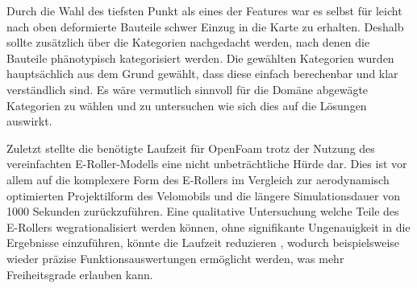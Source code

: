 Durch die Wahl des tiefsten Punkt als eines der Features war es selbst für leicht nach oben deformierte Bauteile schwer Einzug in die Karte zu erhalten.
Deshalb sollte zusätzlich über die Kategorien nachgedacht werden, nach denen die Bauteile phänotypisch kategorisiert werden.
Die gewählten Kategorien wurden hauptsächlich aus dem Grund gewählt, dass diese einfach berechenbar und klar verständlich sind.
Es wäre vermutlich sinnvoll für die Domäne abgewägte Kategorien zu wählen und zu untersuchen wie sich dies auf die Lösungen auswirkt.

Zuletzt stellte die benötigte Laufzeit für OpenFoam trotz der Nutzung des vereinfachten E-Roller-Modells eine nicht unbeträchtliche Hürde dar.
Dies ist vor allem auf die komplexere Form des E-Rollers im Vergleich zur aerodynamisch optimierten Projektilform des Velomobils und die längere Simulationsdauer von 1000 Sekunden zurückzuführen.
Eine qualitative Untersuchung welche Teile des E-Rollers wegrationalisiert werden können, ohne signifikante Ungenauigkeit in die Ergebnisse einzuführen, könnte die Laufzeit reduzieren , wodurch beispielsweise wieder präzise Funktionsauswertungen ermöglicht werden, was mehr Freiheitsgrade erlauben kann.